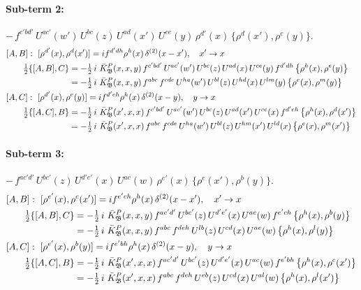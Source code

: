 \documentclass[10pt]{article}
\numberwithin{equation}{section}
\begin{document}
\paragraph{Sub-term 2:} $-\,f^{c'bd'}\,U^{ac'}(w')\,U^{bc}(z)\,U^{ad}(x')\,U^{ce}(y)\,\rho^{d'}(x)\,\big\{\rho^{d}(x'),\rho^{e}(y)\big\}$.
\begin{align}
&[A,B]:\ [\rho^{d'}(x),\rho^{d}(x')]=i f^{d'dh}\rho^{h}(x)\,\delta^{(2)}(x-x'),\quad x'\to x\notag\\
&\qquad \tfrac12\{[A,B],C\}=-\tfrac12\,i\,\,\bar K^{P}_{\mathfrak B}(x,x,y)\,f^{c'bd'}\,U^{ac'}(w')\,U^{bc}(z)\,U^{ad}(x)\,U^{ce}(y)\,f^{d'dh}\,\big\{\rho^{h}(x),\rho^{e}(y)\big\}\notag\\
&\qquad\phantom{\tfrac12\{[A,B],C\}}=-\tfrac12\,i\,\,\bar K^{P}_{\mathfrak B}(x,x,y)\,f^{abc}\,f^{cde}\,U^{ha}(w')\,U^{bl}(z)\,U^{hd}(x)\,U^{lm}(y)\,\big\{\rho^{e}(x),\rho^{m}(y)\big\}
\label{B:eq:GII.I2.P-2-AB}\\
&[A,C]:\ [\rho^{d'}(x),\rho^{e}(y)]=i f^{d'eh}\rho^{h}(x)\,\delta^{(2)}(x-y),\quad y\to x\notag\\
&\qquad \tfrac12\{[A,C],B\}=-\tfrac12\,i\,\,\bar K^{P}_{\mathfrak B}(x',x,x)\,f^{c'bd'}\,U^{ac'}(w')\,U^{bc}(z)\,U^{ad}(x')\,U^{ce}(x)\,f^{d'eh}\,\big\{\rho^{h}(x),\rho^{d}(x')\big\}\notag\\
&\qquad\phantom{\tfrac12\{[A,C],B\}}=-\tfrac12\,i\,\,\bar K^{P}_{\mathfrak B}(x',x,x)\,f^{abc}\,f^{cde}\,U^{ha}(w')\,U^{bl}(z)\,U^{hm}(x')\,U^{ld}(x)\,\big\{\rho^{e}(x),\rho^{m}(x')\big\}
\label{B:eq:GII.I2.P-2-AC}
\end{align}
\paragraph{Sub-term 3:} $-\,f^{ac'd'}\,U^{bc'}(z)\,U^{d'e'}(x)\,U^{ac}(w)\,\rho^{e'}(x)\,\big\{\rho^{c}(x'),\rho^{b}(y)\big\}$.
\begin{align}
&[A,B]:\ [\rho^{e'}(x),\rho^{c}(x')]=i f^{e'ch}\rho^{h}(x)\,\delta^{(2)}(x-x'),\quad x'\to x\notag\\
&\qquad \tfrac12\{[A,B],C\}=-\tfrac12\,i\,\,\bar K^{P}_{\mathfrak B}(x,x,y)\,f^{ac'd'}\,U^{bc'}(z)\,U^{d'e'}(x)\,U^{ac}(w)\,f^{e'ch}\,\big\{\rho^{h}(x),\rho^{b}(y)\big\}\notag\\
&\qquad\phantom{\tfrac12\{[A,B],C\}}=-\tfrac12\,i\,\,\bar K^{P}_{\mathfrak B}(x,x,y)\,f^{abc}\,f^{deh}\,U^{lb}(z)\,U^{cd}(x)\,U^{ae}(w)\,\big\{\rho^{h}(x),\rho^{l}(y)\big\}
\label{B:eq:GII.I2.P-3-AB}\\
&[A,C]:\ [\rho^{e'}(x),\rho^{b}(y)]=i f^{e'bh}\rho^{h}(x)\,\delta^{(2)}(x-y),\quad y\to x\notag\\
&\qquad \tfrac12\{[A,C],B\}=-\tfrac12\,i\,\,\bar K^{P}_{\mathfrak B}(x',x,x)\,f^{ac'd'}\,U^{bc'}(z)\,U^{d'e'}(x)\,U^{ac}(w)\,f^{e'bh}\,\big\{\rho^{h}(x),\rho^{c}(x')\big\}\notag\\
&\qquad\phantom{\tfrac12\{[A,C],B\}}=-\tfrac12\,i\,\,\bar K^{P}_{\mathfrak B}(x',x,x)\,f^{abc}\,f^{deh}\,U^{eb}(z)\,U^{cd}(x)\,U^{al}(w)\,\big\{\rho^{h}(x),\rho^{l}(x')\big\}
\label{B:eq:GII.I2.P-3-AC}
\end{align}
\end{document}
